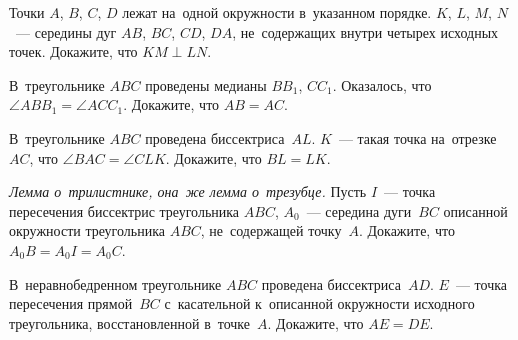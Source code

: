 \begin{problems}
\item
Точки $A$, $B$, $C$, $D$ лежат на~одной окружности в~указанном порядке.
$K$, $L$, $M$, $N$~--- середины дуг $AB$, $BC$, $CD$, $DA$, не~содержащих
внутри четырех исходных точек.
Докажите, что $KM \perp LN$.

\item
В~треугольнике $ABC$ проведены медианы $B B_1$, $C C_1$.
Оказалось, что $\angle A B B_1 = \angle A C C_1$.
Докажите, что $AB = AC$.

\item
В~треугольнике $ABC$ проведена биссектриса~$AL$.
$K$~--- такая точка на~отрезке~$AC$, что $\angle BAC = \angle CLK$.
Докажите, что $BL = LK$.

\item\emph{Лемма о~трилистнике, она~же лемма о~трезубце.}
Пусть $I$~--- точка пересечения биссектрис треугольника $ABC$,
$A_0$~--- середина дуги~$BC$ описанной окружности треугольника $ABC$,
не~содержащей точку~$A$.
Докажите, что $A_0 B = A_0 I = A_0 C$.

\item
В~неравнобедренном треугольнике $ABC$ проведена биссектриса~$AD$.
$E$~--- точка пересечения прямой~$BC$ с~касательной к~описанной окружности
исходного треугольника, восстановленной в~точке~$A$.
Докажите, что $AE = DE$.

\end{problems}

